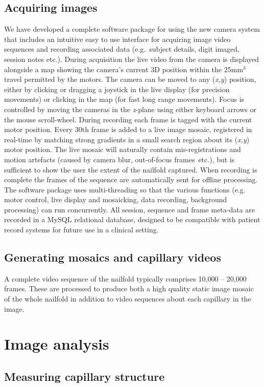 \documentclass[runningheads,a4paper]{llncs}
\def\eg{e.g.}
\def\etc{etc.}
\begin{document}
\subsection{Acquiring images}
%
We have developed a complete software package for using the new camera system that includes an intuitive easy to use interface for acquiring image video sequences and recording associated data (\eg~subject details, digit imaged, session notes \etc). During acquisition the live video from the camera is displayed alongside a map showing the camera’s current 3D position within the 25mm$^3$ travel permitted by the motors. The camera can be moved to any (\textit{x,y}) position, either by clicking or dragging a joystick in the live display (for precision movements) or clicking in the map (for fast long range movements). Focus is controlled by moving the cameras in the \textit{z}-plane using either keyboard arrows or the mouse scroll-wheel. During recording each frame is tagged with the current motor position. Every 30th frame is added to a live image mosaic, registered in real-time by matching strong gradients in a small search region about its  (\textit{x,y}) motor position. The live mosaic will naturally contain mis-registrations and motion artefacts (caused by camera blur, out-of-focus frames~\etc), but is sufficient to show the user the extent of the nailfold captured. When recording is complete the frames of the sequence are automatically sent for offline processing. The software package uses multi-threading so that the various functions (e.g. motor control, live display and mosaicking, data recording, background processing) can run concurrently. All session, sequence and frame meta-data are recorded in a MySQL relational database, designed to be compatible with patient record systems for future use in a clinical setting. 
%
\subsection{Generating mosaics and capillary videos}
%
A complete video sequence of the nailfold typically comprises 10,000 – 20,000 frames. These are processed to produce both a high quality static image mosaic of the whole nailfold in addition to video sequences about each capillary in the image.
%
\section{Image analysis}
\label{s:image_analysis}

\subsection{Measuring capillary structure}
\end{document}
